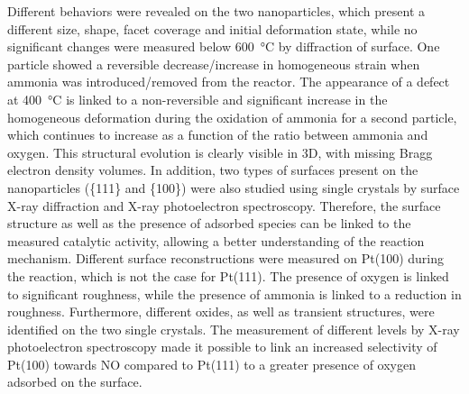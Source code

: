 \begin{mdframed}[linecolor=Prune,linewidth=1]
\begin{multicols}{2}
Different behaviors were revealed on the two nanoparticles, which present a different size, shape, facet coverage and initial deformation state, while no significant changes were measured below \qty{600}{\degreeCelsius} by diffraction of surface.
One particle showed a reversible decrease/increase in homogeneous strain when ammonia was introduced/removed from the reactor.
The appearance of a defect at \qty{400}{\degreeCelsius} is linked to a non-reversible and significant increase in the homogeneous deformation during the oxidation of ammonia for a second particle, which continues to increase as a function of the ratio between ammonia and oxygen.
This structural evolution is clearly visible in 3D, with missing Bragg electron density volumes.
In addition, two types of surfaces present on the nanoparticles (\{111\} and \{100\}) were also studied using single crystals by surface X-ray diffraction and X-ray photoelectron spectroscopy.
Therefore, the surface structure as well as the presence of adsorbed species can be linked to the measured catalytic activity, allowing a better understanding of the reaction mechanism.
Different surface reconstructions were measured on Pt(100) during the reaction, which is not the case for Pt(111).
The presence of oxygen is linked to significant roughness, while the presence of ammonia is linked to a reduction in roughness.
Furthermore, different oxides, as well as transient structures, were identified on the two single crystals.
The measurement of different levels by X-ray photoelectron spectroscopy made it possible to link an increased selectivity of Pt(100) towards NO compared to Pt(111) to a greater presence of oxygen adsorbed on the surface.
\end{multicols}

\end{mdframed}

\normalsize

\vspace{\fill}

\newpage\thispagestyle{empty}\null\newpage